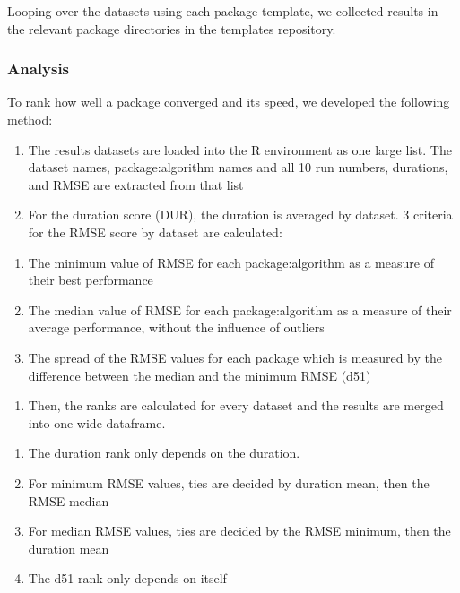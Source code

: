 Looping over the datasets using each package template, we collected
results in the relevant package directories in the templates repository.

\hypertarget{analysis}{%
\subsubsection{Analysis}\label{analysis}}

To rank how well a package converged and its speed, we developed the
following method:

\begin{enumerate}
\def\labelenumi{\arabic{enumi}.}
\tightlist
\item
  The results datasets are loaded into the R environment as one large
  list. The dataset names, package:algorithm names and all 10 run
  numbers, durations, and RMSE are extracted from that list
\item
  For the duration score (DUR), the duration is averaged by dataset. 3
  criteria for the RMSE score by dataset are calculated:
\end{enumerate}

\begin{enumerate}
\def\labelenumi{\alph{enumi}.}
\tightlist
\item
  The minimum value of RMSE for each package:algorithm as a measure of
  their best performance
\item
  The median value of RMSE for each package:algorithm as a measure of
  their average performance, without the influence of outliers
\item
  The spread of the RMSE values for each package which is measured by
  the difference between the median and the minimum RMSE (d51)
\end{enumerate}

\begin{enumerate}
\def\labelenumi{\arabic{enumi}.}
\setcounter{enumi}{2}
\tightlist
\item
  Then, the ranks are calculated for every dataset and the results are
  merged into one wide dataframe.
\end{enumerate}

\begin{enumerate}
\def\labelenumi{\alph{enumi}.}
\tightlist
\item
  The duration rank only depends on the duration.
\item
  For minimum RMSE values, ties are decided by duration mean, then the
  RMSE median
\item
  For median RMSE values, ties are decided by the RMSE minimum, then the
  duration mean
\item
  The d51 rank only depends on itself
\end{enumerate}

